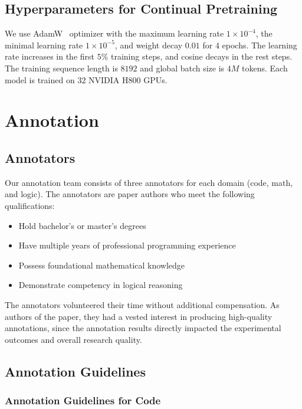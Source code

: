 \subsection{Hyperparameters for Continual Pretraining}

We use AdamW~\citep{loshchilov_decoupled_2019} optimizer with the maximum
learning rate $1\times 10^{-4}$, the minimal learning rate $1\times 10^{-5}$,
and weight decay $0.01$ for $4$ epochs. The learning rate increases in the first
$5\%$ training steps, and cosine decays in the rest steps. The training sequence
length is $8192$ and global batch size is $4M$ tokens. Each model is trained on
$32$ NVIDIA H800 GPUs.

\section{Annotation}
\label{sec:annotation}

\subsection{Annotators}

Our annotation team consists of three annotators for each domain (code, math, and
logic). The annotators are paper authors who meet the following qualifications:

\begin{itemize}
    \item Hold bachelor's or master's degrees

    \item Have multiple years of professional programming experience

    \item Possess foundational mathematical knowledge

    \item Demonstrate competency in logical reasoning
\end{itemize}

The annotators volunteered their time without additional compensation. As authors
of the paper, they had a vested interest in producing high-quality annotations, since
the annotation results directly impacted the experimental outcomes and overall research
quality.

\subsection{Annotation Guidelines}

\subsubsection{Annotation Guidelines for Code}

